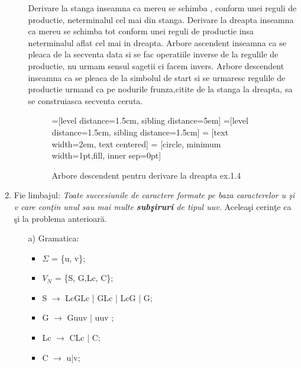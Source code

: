 \begin{enumerate}
\begin{enumerate}
Derivare la stanga inseamna ca mereu se schimba , conform unei reguli de productie, neterminalul cel mai din stanga.\newline
Derivare la dreapta inseamna ca mereu se schimba tot conform unei reguli de productie insa neterminalul aflat cel mai in dreapta.\newline
Arbore ascendent inseamna ca se pleaca de la secventa data si se fac operatiile inverse de la regulile de productie, nu urmam sensul sagetii ci facem invers. \newline
Arbore descendent inseamna ca se pleaca de la simbolul de start si se urmaresc regulile de productie urmand ca pe nodurile frunza,citite de la stanga la dreapta, sa se construiasca secventa ceruta.

\begin{figure}[H]
=[level distance=1.5cm, sibling distance=5em]
=[level distance=1.5cm, sibling distance=1.5cm]
 = [text width=2em, text centered]
 = [circle, minimum width=1pt,fill, inner sep=0pt]
\caption{Arbore descendent pentru derivare la dreapta ex.1.4}
\end{figure}
\end{enumerate}

\item
Fie limbajul: \textit{Toate succesiunile de caractere formate pe baza caracterelor u şi v care conţin unul sau mai multe \textbf{subşiruri} de tipul uuv.} Aceleaşi cerinţe ca şi la problema anterioară.

\begin{enumerate}
\item[a)]
Gramatica:
\begin{itemize}
\item
$\Sigma$ = \{u, v\};
\item
$V_{N}$ = \{S, G,Lc, C\};
\item
S $\rightarrow$ LcGLc | GLc | LcG | G;
\item
G $\rightarrow$ Guuv | uuv ;
\item
Lc $\rightarrow$ CLc | C;
\item
C $\rightarrow$ u|v;
\end{itemize}


\end{enumerate}
\end{enumerate}

